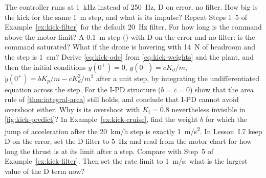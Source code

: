 \begin{exercises}
\exercise[1] The controller runs at \SI{1}{kHz} instead of \SI{250}{Hz}, D on error, no filter. How big is the kick for the same \SI{1}{m} step, and what is its impulse?
\exercise[1] Repeat Steps 1–5 of Example~\ref{ex:kick-filter} for the default \SI{20}{Hz} filter. For how long is the command above the motor limit?
\exercise[1] A \SI{0.1}{m} step () with D on the error and no filter: is the command saturated? What if the drone is hovering with \SI{14}{N} of headroom and the step is \SI{1}{cm}?
\exercise[2] Derive \cref{eq:kick-ode} from \cref{eq:kick-weights} and the plant, and then the initial conditions $y(0^+) = 0$, $\dot y(0^+) = cK_d/m$, $\ddot y(0^+) = bK_p/m - cK_d^2/m^2$ after a unit step, by integrating the undifferentiated equation across the step.
\exercise[2] For the I-PD structure ($b = c = 0$) show that the area rule of \cref{thm:integral-area} still holds, and conclude that I-PD cannot avoid overshoot either. Why is its overshoot with $K_i = 0.8$ nevertheless invisible in \cref{fig:kick-predict}?
\exercise[2] In Example~\ref{ex:kick-cruise}, find the weight $b$ for which the jump of acceleration after the \SI{20}{km/h} step is exactly \SI{1}{m/s^2}.
\exercise[2] In Lesson~I.7 keep D on the error, set the D filter to \SI{5}{Hz} and read from the motor chart for how long the thrust is at its limit after a step. Compare with Step~5 of Example~\ref{ex:kick-filter}. Then set the rate limit to \SI{1}{m/s}: what is the largest value of the D term now?

\end{exercises}
